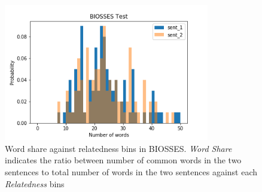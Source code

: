 \begin{enumerate}
\begin{figure}
	\centering
	\includegraphics[width=0.8\textwidth]{figures/semantic_textual_similarity/introduction/biosses_words.png}
	\caption[Word share against relatedness bins in BIOSSES.]{Word share against relatedness bins in BIOSSES. \textit{Word Share} indicates the ratio between number of common words in the two sentences to total number of words in the two sentences against each \textit{Relatedness} bins}
	\label{fig:biosses_words}
\end{figure}



	
	 

\end{enumerate}

